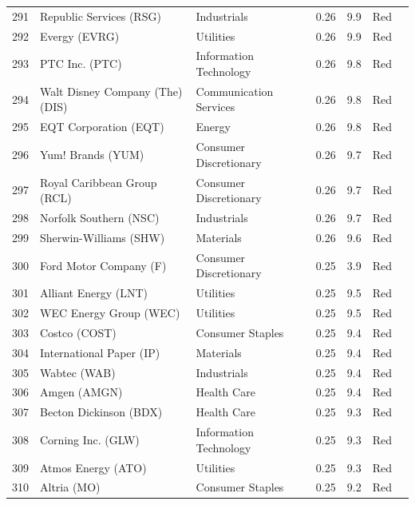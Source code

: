 \documentclass[11pt,a4paper]{article}
\begin{document}
{\begin{longtable}{r p{4.4cm} p{2.8cm} r r l l}
291 & Republic Services (RSG) & Industrials & 0.26 & 9.9 & \cellcolor[HTML]{F4B6B6}Red &  \\
292 & Evergy (EVRG) & Utilities & 0.26 & 9.9 & \cellcolor[HTML]{F4B6B6}Red &  \\
293 & PTC Inc. (PTC) & Information Technology & 0.26 & 9.8 & \cellcolor[HTML]{F4B6B6}Red &  \\
294 & Walt Disney Company (The) (DIS) & Communication Services & 0.26 & 9.8 & \cellcolor[HTML]{F4B6B6}Red &  \\
295 & EQT Corporation (EQT) & Energy & 0.26 & 9.8 & \cellcolor[HTML]{F4B6B6}Red &  \\
296 & Yum! Brands (YUM) & Consumer Discretionary & 0.26 & 9.7 & \cellcolor[HTML]{F4B6B6}Red &  \\
297 & Royal Caribbean Group (RCL) & Consumer Discretionary & 0.26 & 9.7 & \cellcolor[HTML]{F4B6B6}Red &  \\
298 & Norfolk Southern (NSC) & Industrials & 0.26 & 9.7 & \cellcolor[HTML]{F4B6B6}Red &  \\
299 & Sherwin-Williams (SHW) & Materials & 0.26 & 9.6 & \cellcolor[HTML]{F4B6B6}Red &  \\
300 & Ford Motor Company (F) & Consumer Discretionary & 0.25 & 3.9 & \cellcolor[HTML]{F4B6B6}Red &  \\
301 & Alliant Energy (LNT) & Utilities & 0.25 & 9.5 & \cellcolor[HTML]{F4B6B6}Red &  \\
302 & WEC Energy Group (WEC) & Utilities & 0.25 & 9.5 & \cellcolor[HTML]{F4B6B6}Red &  \\
303 & Costco (COST) & Consumer Staples & 0.25 & 9.4 & \cellcolor[HTML]{F4B6B6}Red &  \\
304 & International Paper (IP) & Materials & 0.25 & 9.4 & \cellcolor[HTML]{F4B6B6}Red &  \\
305 & Wabtec (WAB) & Industrials & 0.25 & 9.4 & \cellcolor[HTML]{F4B6B6}Red &  \\
306 & Amgen (AMGN) & Health Care & 0.25 & 9.4 & \cellcolor[HTML]{F4B6B6}Red &  \\
307 & Becton Dickinson (BDX) & Health Care & 0.25 & 9.3 & \cellcolor[HTML]{F4B6B6}Red &  \\
308 & Corning Inc. (GLW) & Information Technology & 0.25 & 9.3 & \cellcolor[HTML]{F4B6B6}Red &  \\
309 & Atmos Energy (ATO) & Utilities & 0.25 & 9.3 & \cellcolor[HTML]{F4B6B6}Red &  \\
310 & Altria (MO) & Consumer Staples & 0.25 & 9.2 & \cellcolor[HTML]{F4B6B6}Red &  \\

\end{longtable}}
\end{document}
